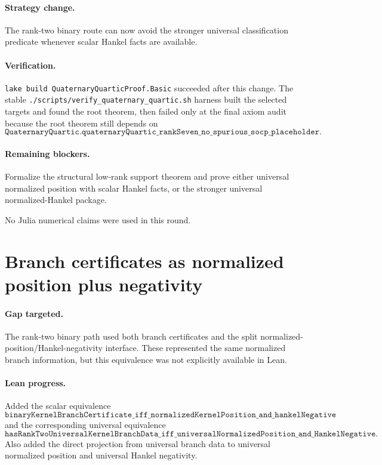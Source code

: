 \documentclass[11pt]{article}
\begin{document}
\paragraph{Strategy change.}
The rank-two binary route can now avoid the stronger universal classification
predicate whenever scalar Hankel facts are available.

\paragraph{Verification.}
\texttt{lake build QuaternaryQuarticProof.Basic} succeeded after this change.
The stable \texttt{./scripts/verify\_quaternary\_quartic.sh} harness built the
selected targets and found the root theorem, then failed only at the final axiom
audit because the root theorem still depends on
\[
\texttt{QuaternaryQuartic.quaternaryQuartic\_rankSeven\_no\_spurious\_socp\_placeholder}.
\]

\paragraph{Remaining blockers.}
Formalize the structural low-rank support theorem and prove either universal
normalized position with scalar Hankel facts, or the stronger universal
normalized-Hankel package.

No Julia numerical claims were used in this round.

\section*{Branch certificates as normalized position plus negativity}

\paragraph{Gap targeted.}
The rank-two binary path used both branch certificates and the split
normalized-position/Hankel-negativity interface.  These represented the same
normalized branch information, but this equivalence was not explicitly
available in Lean.

\paragraph{Lean progress.}
Added the scalar equivalence
\[
\texttt{binaryKernelBranchCertificate\_iff\_normalizedKernelPosition\_and\_hankelNegative}
\]
and the corresponding universal equivalence
\[
\texttt{hasRankTwoUniversalKernelBranchData\_iff\_universalNormalizedPosition\_and\_HankelNegative}.
\]
Also added the direct projection from universal branch data to universal
normalized position and universal Hankel negativity.
\end{document}
